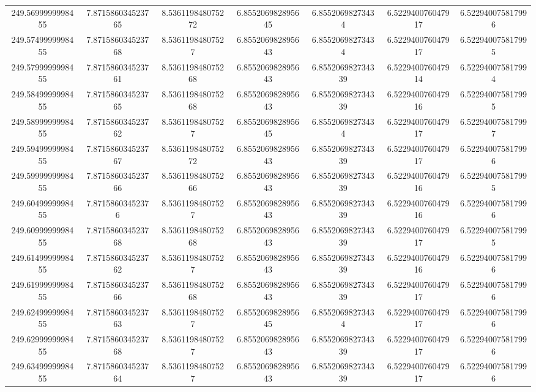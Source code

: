 \begin{center}
{\begin{tabular}{| c | c | c | c | c | c | c |}
249.5699999998455  & 7.871586034523765  & 8.536119848075272  & 6.855206982895645  & 6.85520698273434  & 6.522940076047917  & 6.522940075817996 \\
249.5749999998455  & 7.871586034523768  & 8.53611984807527  & 6.855206982895643  & 6.85520698273434  & 6.522940076047917  & 6.522940075817995 \\
249.5799999998455  & 7.871586034523761  & 8.536119848075268  & 6.855206982895643  & 6.855206982734339  & 6.522940076047914  & 6.522940075817994 \\
249.5849999998455  & 7.871586034523765  & 8.536119848075268  & 6.855206982895643  & 6.855206982734339  & 6.522940076047916  & 6.522940075817995 \\
249.5899999998455  & 7.871586034523762  & 8.53611984807527  & 6.855206982895645  & 6.85520698273434  & 6.522940076047917  & 6.522940075817997 \\
249.5949999998455  & 7.871586034523767  & 8.536119848075272  & 6.855206982895643  & 6.855206982734339  & 6.522940076047917  & 6.522940075817996 \\
249.5999999998455  & 7.871586034523766  & 8.536119848075266  & 6.855206982895643  & 6.855206982734339  & 6.522940076047916  & 6.522940075817995 \\
249.6049999998455  & 7.87158603452376  & 8.53611984807527  & 6.855206982895643  & 6.855206982734339  & 6.522940076047916  & 6.522940075817996 \\
249.6099999998455  & 7.871586034523768  & 8.536119848075268  & 6.855206982895643  & 6.855206982734339  & 6.522940076047917  & 6.522940075817995 \\
249.6149999998455  & 7.871586034523762  & 8.53611984807527  & 6.855206982895643  & 6.855206982734339  & 6.522940076047916  & 6.522940075817996 \\
249.6199999998455  & 7.871586034523766  & 8.536119848075268  & 6.855206982895643  & 6.855206982734339  & 6.522940076047917  & 6.522940075817996 \\
249.6249999998455  & 7.871586034523763  & 8.53611984807527  & 6.855206982895645  & 6.85520698273434  & 6.522940076047917  & 6.522940075817996 \\
249.6299999998455  & 7.871586034523768  & 8.53611984807527  & 6.855206982895643  & 6.855206982734339  & 6.522940076047917  & 6.522940075817996 \\
249.6349999998455  & 7.871586034523764  & 8.53611984807527  & 6.855206982895643  & 6.855206982734339  & 6.522940076047917  & 6.522940075817996 \\

\end{tabular}}
\end{center}
